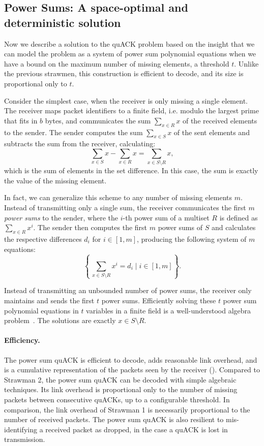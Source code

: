\subsection{Power Sums: A space-optimal and deterministic solution}
\label{sec:quack:constructions:power-sum}

Now we describe a solution to the quACK problem based on the insight
that we can model the problem as a system of power sum polynomial equations
when we have a bound on the maximum number of missing elements, a threshold $t$.
Unlike the previous strawmen, this construction is efficient to decode, and
its size is proportional only to $t$.

Consider the simplest case, when the receiver is only missing a single element.
The receiver maps packet identifiers to a finite field,
i.e. modulo the largest prime that fits in $b$ bytes,
 and communicates the sum $\sum_{x \in R} x$ of the received
elements to
the sender. The sender computes the sum $\sum_{x \in S} x$ of the sent elements
and subtracts the sum from the receiver, calculating:
\[
    \sum_{x \in S} x - \sum_{x \in R} x = \sum_{x \in S\setminus R} x,
\]
which is the sum of elements in the set difference. In this case, the sum is
exactly the value of the missing element.

In fact, we can generalize this scheme to any number of missing elements $m$.
Instead of transmitting only a single sum, the receiver communicates
the first $m$ \emph{power sums} to the sender, where the $i$-th power sum of a
multiset $R$ is defined as $\sum_{x \in R} x^i$.
The sender then computes the first $m$ power sums of $S$ and calculates the
respective differences $d_i$ for $i \in [1,m]$, producing the following
system of $m$ equations:
\[
    \left\{\, \sum_{x \in S\setminus R} x^i = d_i \mid i \in [1,m] \right\}.
\]

Instead of transmitting an unbounded number of power sums, the receiver only
maintains and sends the first $t$ power sums. Efficiently solving these $t$
power sum polynomial equations in $t$ variables in a finite field is a
well-understood algebra problem~\cite{eppstein2011straggler}. The solutions are
exactly $x \in S \setminus R$.

\paragraph{Efficiency.}
The power sum quACK is efficient to decode, adds reasonable link overhead,
and is a cumulative representation of the packets seen by the receiver
().
Compared to Strawman 2, the power sum quACK can be decoded with simple
algebraic techniques.
Its link overhead is proportional only to the number of
missing packets between consecutive quACKs, up to a configurable threshold. In
comparison, the link overhead of Strawman 1 is necessarily proportional to the
number of received packets.
The power sum quACK is also resilient to mis-identifying a received packet as
dropped, in the case a quACK is lost in transmission.

